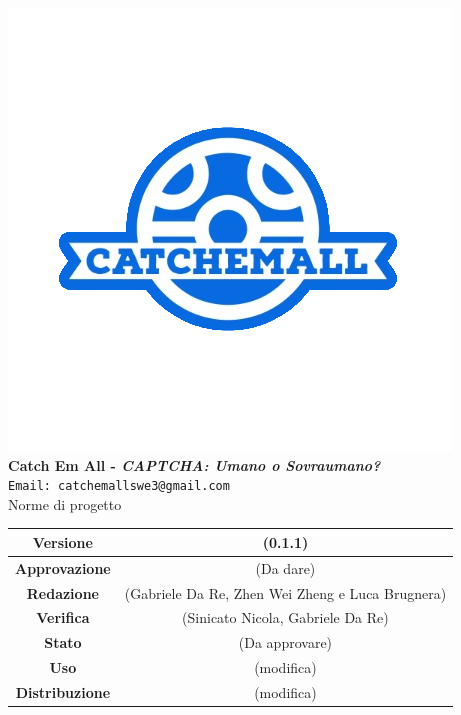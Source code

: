 \begin{titlepage}
\begin{center}
	\includegraphics[scale = 1.5]{img/logo.png}\\
	\bigskip
	\large \textbf{Catch Em All - \textit{CAPTCHA: Umano o Sovraumano?}}\\
	\texttt{Email: catchemallswe3@gmail.com}\\
	\vfill
	{\fontsize{1.5cm}{0}\selectfont Norme di progetto}\\
	\vfill
	\begin{tabularx}{\textwidth}{| c | c |}
		\hline
		\textbf{Versione} & (0.1.1)\\
		\hline
		\textbf{Approvazione} & (Da dare)\\
		\hline
		\textbf{Redazione} & (Gabriele Da Re, Zhen Wei Zheng e Luca Brugnera)\\
		\hline
		\textbf{Verifica} & (Sinicato Nicola, Gabriele Da Re)\\
		\hline
		\textbf{Stato} & (Da approvare)\\
		\hline
		\textbf{Uso} & (modifica)\\
		\hline
		\textbf{Distribuzione} & (modifica)\\
		\hline
	\end{tabularx}
\end{center}
\end{titlepage}